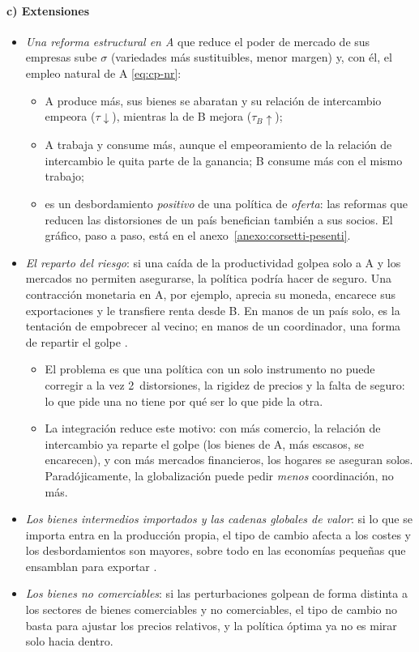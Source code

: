 \documentclass[11pt]{article}
\begin{document}
\paragraph{c) Extensiones}\label{sec:corsetti-pesenti-extensiones}
\begin{itemize}
\item \emph{Una reforma estructural en A} que reduce el poder de mercado de sus empresas sube $\sigma$ (variedades más sustituibles, menor margen) y, con él, el empleo natural de A \eqref{eq:cp-nr}:
  \begin{itemize}
  \item A produce más, sus bienes se abaratan y su relación de intercambio empeora ($\tau\downarrow$), mientras la de B mejora ($\tau_B\uparrow$);
  \item A trabaja y consume más, aunque el empeoramiento de la relación de intercambio le quita parte de la ganancia; B consume más con el mismo trabajo;
  \item es un desbordamiento \emph{positivo} de una política de \emph{oferta}: las reformas que reducen las distorsiones de un país benefician también a sus socios\nocite{CorsettiPesenti2009}. El gráfico, paso a paso, está en el anexo~\ref{anexo:corsetti-pesenti}.
  \end{itemize}
\item \emph{El reparto del riesgo}: si una caída de la productividad golpea solo a A y los mercados no permiten asegurarse, la política podría hacer de seguro. Una contracción monetaria en A, por ejemplo, aprecia su moneda, encarece sus exportaciones y le transfiere renta desde B. En manos de un país solo, es la tentación de empobrecer al vecino; en manos de un coordinador, una forma de repartir el golpe\nocite{Bergin2008Palgrave} .
  \begin{itemize}
  \item El problema es que una política con un solo instrumento no puede corregir a la vez 2~distorsiones, la rigidez de precios y la falta de seguro: lo que pide una no tiene por qué ser lo que pide la otra\nocite{ObstfeldRogoff2002Global}.
  \item La integración reduce este motivo: con más comercio, la relación de intercambio ya reparte el golpe (los bienes de A, más escasos, se encarecen), y con más mercados financieros, los hogares se aseguran solos. Paradójicamente, la globalización puede pedir \emph{menos} coordinación, no más\nocite{Bergin2002FRBSF}.
  \end{itemize}
\item \emph{Los bienes intermedios importados y las cadenas globales de valor}: si lo que se importa entra en la producción propia, el tipo de cambio afecta a los costes y los desbordamientos son mayores, sobre todo en las economías pequeñas que ensamblan para exportar .
\item \emph{Los bienes no comerciables}: si las perturbaciones golpean de forma distinta a los sectores de bienes comerciables y no comerciables, el tipo de cambio no basta para ajustar los precios relativos, y la política óptima ya no es mirar solo hacia dentro\nocite{CorsettiPesenti2009}.
\end{itemize}
\end{document}
